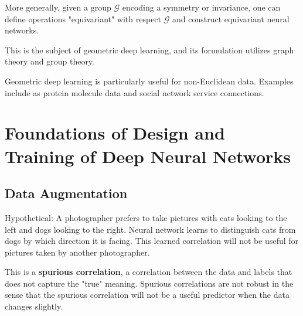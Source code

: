 \documentclass{report}
\begin{document}
\begin{concept}
    More generally, given a group $\mathcal{G}$ encoding a symmetry or invariance, one can define operations "equivariant" with respect $\mathcal{G}$ and construct equivariant neural networks.

    This is the subject of geometric deep learning, and its formulation utilizes graph theory and group theory.

    Geometric deep learning is particularly useful for non-Euclidean data. Examples include as protein molecule data and social network service connections.
\end{concept}

\chapter{Foundations of Design and Training of Deep Neural Networks}

\section{Data Augmentation}

\begin{definition}
    Hypothetical: A photographer prefers to take pictures with cats looking to the left and dogs looking to the right. Neural network learns to distinguish cats from dogs by which direction it is facing. This learned correlation will not be useful for pictures taken by another photographer.

    This is a \textbf{spurious correlation}, a correlation between the data and labels that does not capture the "true" meaning. Spurious correlations are not robust in the sense that the spurious correlation will not be a useful predictor when the data changes slightly.
\end{definition}
\end{document}
